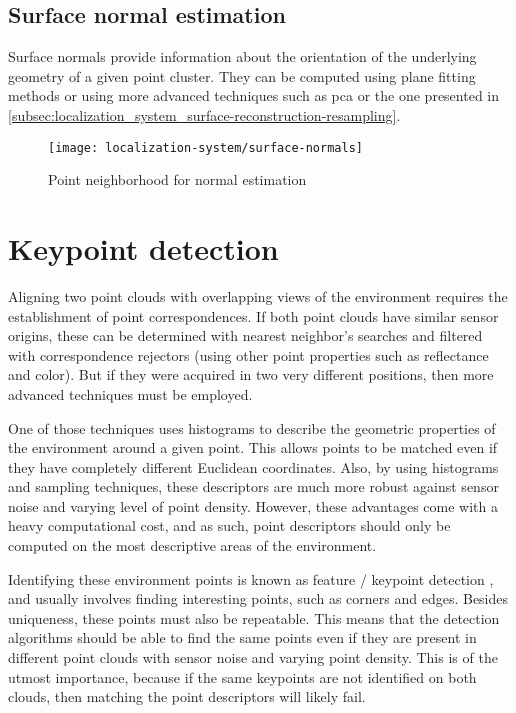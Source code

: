 \subsection{Surface normal estimation}

Surface normals provide information about the orientation of the underlying geometry of a given point cluster. They can be computed using plane fitting methods or using more advanced techniques such as \gls{pca} \cite{Jolliffe2002} or the one presented in \cref{subsec:localization_system_surface-reconstruction-resampling}.

\begin{figure}[H]
	\centering
	\texttt{[image: localization-system/surface-normals]}
	\caption[Point neighborhood for normal estimation]{Point neighborhood for normal estimation \cite{Rusu2010a}}
	\label{fig:localization_system_surface-normals}
\end{figure}



\section{Keypoint detection}

Aligning two point clouds with overlapping views of the environment requires the establishment of point correspondences. If both point clouds have similar sensor origins, these can be determined with nearest neighbor's searches and filtered with correspondence rejectors (using other point properties such as reflectance and color). But if they were acquired in two very different positions, then more advanced techniques must be employed.

One of those techniques uses histograms to describe the geometric properties of the environment around a given point. This allows points to be matched even if they have completely different Euclidean coordinates. Also, by using histograms and sampling techniques, these descriptors are much more robust against sensor noise and varying level of point density. However, these advantages come with a heavy computational cost, and as such, point descriptors should only be computed on the most descriptive areas of the environment.

Identifying these environment points is known as feature / keypoint detection \cite{Filipe2014}, and usually involves finding interesting points, such as corners and edges. Besides uniqueness, these points must also be repeatable. This means that the detection algorithms should be able to find the same points even if they are present in different point clouds with sensor noise and varying point density. This is of the utmost importance, because if the same keypoints are not identified on both clouds, then matching the point descriptors will likely fail.

